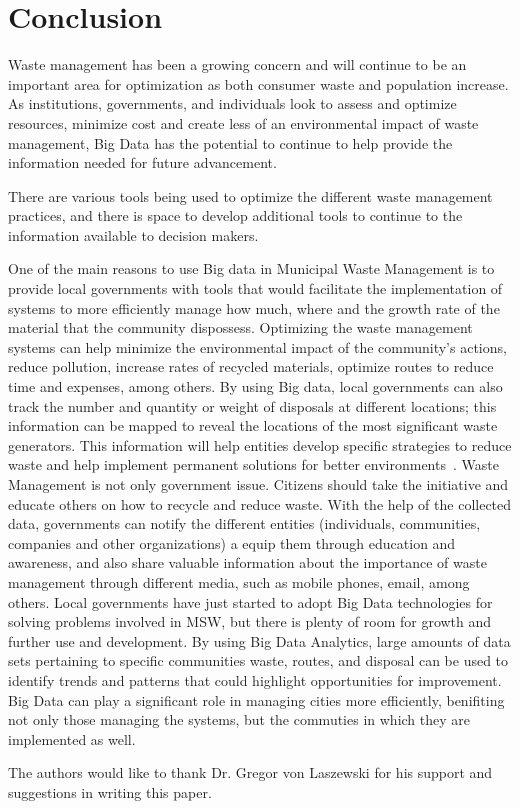\documentclass[sigconf]{acmart}
\begin{document}
\section{Conclusion}
Waste management has been a growing concern and will continue to be an important area for optimization as both consumer waste and population increase.  As institutions, governments, and individuals look to assess and optimize resources, minimize cost and create less of an environmental impact of waste management, Big Data has the potential to continue to help provide the information needed for future advancement.

There are various tools being used to optimize the different waste management practices, and there is space to develop additional tools to continue to the information available to decision makers.

One of the main reasons to use Big data in Municipal Waste Management is to provide local governments with tools that would facilitate the implementation of systems to more efficiently manage how much, where and the growth rate of the material that the community dispossess. Optimizing the waste management systems can help minimize the environmental impact of the community's actions, reduce pollution, increase rates of recycled materials, optimize routes to reduce time and expenses, among others.
By using Big data, local governments can also track the number and quantity or weight of disposals at different locations; this information can be mapped to reveal the locations of the most significant waste generators.  This information will help entities develop specific strategies to reduce waste and help implement permanent solutions for better environments~\cite{markvan2016}. 
Waste Management is not only government issue. Citizens should take the initiative and educate others on how to recycle and reduce waste. With the help of the collected data, governments can notify the different entities (individuals, communities, companies and other organizations) a equip them through education and awareness, and also share valuable information about the importance of waste management through different media, such as mobile phones, email, among others.
Local governments have just started to adopt Big Data technologies for solving problems involved in MSW, but there is plenty of room for growth and further use and development.  By using Big Data Analytics, large amounts of data sets pertaining to specific communities waste, routes, and disposal can be used to identify trends and patterns that could highlight opportunities for improvement. Big Data can play a significant role in managing cities more efficiently, benifiting not only those managing the systems, but the commuties in which they are implemented as well.
\begin{acks}

The authors would like to thank Dr. Gregor von Laszewski for his support and suggestions in writing this paper.

\end{acks}

 
\end{document}
